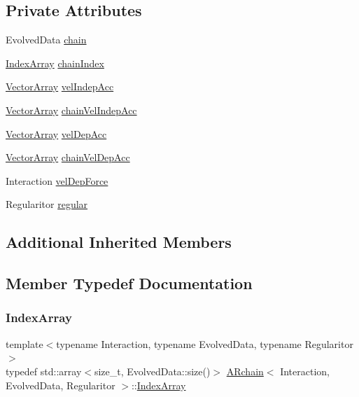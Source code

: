\subsection*{Private Attributes}
\begin{DoxyCompactItemize}
\item 
Evolved\+Data \mbox{\hyperlink{class_a_rchain_af7780024bfc1beca5f5622086b909db2}{chain}}
\item 
\mbox{\hyperlink{class_a_rchain_aae40d4b5881eecfc960814f9e368215d}{Index\+Array}} \mbox{\hyperlink{class_a_rchain_a0691e6612b661e329f1fc72d4cb7c895}{chain\+Index}}
\item 
\mbox{\hyperlink{class_a_rchain_a019fbadb9f4e5892736d9127537338bb}{Vector\+Array}} \mbox{\hyperlink{class_a_rchain_a9359b4fb9f08ad849b0f1dfbdf661016}{vel\+Indep\+Acc}}
\item 
\mbox{\hyperlink{class_a_rchain_a019fbadb9f4e5892736d9127537338bb}{Vector\+Array}} \mbox{\hyperlink{class_a_rchain_a80d060a3341913f94c4bbbf2e2321b1d}{chain\+Vel\+Indep\+Acc}}
\item 
\mbox{\hyperlink{class_a_rchain_a019fbadb9f4e5892736d9127537338bb}{Vector\+Array}} \mbox{\hyperlink{class_a_rchain_a3c3a74f839bbfe5cbe1d8eb239dd8cc1}{vel\+Dep\+Acc}}
\item 
\mbox{\hyperlink{class_a_rchain_a019fbadb9f4e5892736d9127537338bb}{Vector\+Array}} \mbox{\hyperlink{class_a_rchain_a64087e0cb9cdb6b118b4a6e416d9f012}{chain\+Vel\+Dep\+Acc}}
\item 
Interaction \mbox{\hyperlink{class_a_rchain_a5ad11cefbdb69a58225b799b36dd9eee}{vel\+Dep\+Force}}
\item 
Regularitor \mbox{\hyperlink{class_a_rchain_a4dd20aa56d6a6403260ad3ced2987eb0}{regular}}
\end{DoxyCompactItemize}
\subsection*{Additional Inherited Members}


\subsection{Member Typedef Documentation}
\mbox{\label{class_a_rchain_aae40d4b5881eecfc960814f9e368215d}} 
\subsubsection{\texorpdfstring{Index\+Array}{IndexArray}}
{\footnotesize\ttfamily template$<$typename Interaction, typename Evolved\+Data, typename Regularitor$>$ \\
typedef std\+::array$<$size\+\_\+t, Evolved\+Data\+::size()$>$ \mbox{\hyperlink{class_a_rchain}{A\+Rchain}}$<$ Interaction, Evolved\+Data, Regularitor $>$\+::\mbox{\hyperlink{class_a_rchain_aae40d4b5881eecfc960814f9e368215d}{Index\+Array}}}

